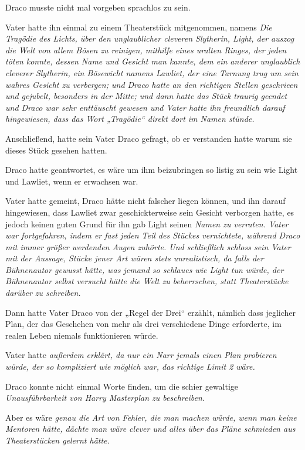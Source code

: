 {Draco musste nicht mal vorgeben sprachlos zu sein.

Vater hatte ihn einmal zu einem Theaterstück mitgenommen, namens \emph{Die Tragödie des Lichts, über den \emph{unglaublicher} cleveren Slytherin, Light, der auszog die Welt von allem Bösen zu reinigen, mithilfe eines uralten Ringes, der jeden töten konnte, dessen Name und Gesicht man kannte, dem ein anderer unglaublich cleverer Slytherin, ein Bösewicht namens Lawliet, der eine Tarnung trug um sein wahres Gesicht zu verbergen; und Draco hatte an den richtigen Stellen geschrieen und gejubelt, besonders in der Mitte; und dann hatte das Stück traurig geendet und Draco war sehr enttäuscht gewesen und Vater hatte ihn freundlich darauf hingewiesen, dass das Wort „Tragödie“ direkt dort im Namen stünde.}

Anschließend, hatte sein Vater Draco gefragt, ob er verstanden hatte warum sie dieses Stück gesehen hatten.

Draco hatte geantwortet, es wäre um ihm beizubringen so listig zu sein wie Light und Lawliet, wenn er erwachsen war.

Vater hatte gemeint, Draco hätte nicht falscher liegen können, und ihn darauf hingewiesen, dass Lawliet zwar geschickterweise sein Gesicht verborgen hatte, es jedoch keinen guten Grund für ihn gab Light seinen \emph{Namen zu verraten. Vater war fortgefahren, indem er fast jeden Teil des Stückes vernichtete, während Draco mit immer größer werdenden Augen zuhörte. Und schließlich schloss sein Vater mit der Aussage, Stücke jener Art wären \emph{stets} unrealistisch, da falls der Bühnenautor gewusst hätte, was jemand so schlaues wie Light tun würde, der Bühnenautor selbst versucht hätte die Welt zu beherrschen, statt Theaterstücke darüber zu schreiben.}

Dann hatte Vater Draco von der „Regel der Drei“ erzählt, nämlich dass jeglicher Plan, der das Geschehen von mehr als drei verschiedene Dinge erforderte, im realen Leben niemals funktionieren würde.

Vater hatte \emph{außerdem erklärt, da nur ein Narr jemals einen Plan probieren würde, der so \emph{kompliziert wie möglich} war, das richtige Limit 2 wäre.}

Draco konnte nicht einmal Worte finden, um die schier gewaltige \emph{Unausführbarkeit von Harry Masterplan zu beschreiben.}

Aber es wäre \emph{genau die Art von Fehler, die man machen würde, wenn man keine Mentoren hätte, dächte man wäre clever und alles über das Pläne schmieden aus Theaterstücken gelernt hätte.}

}
